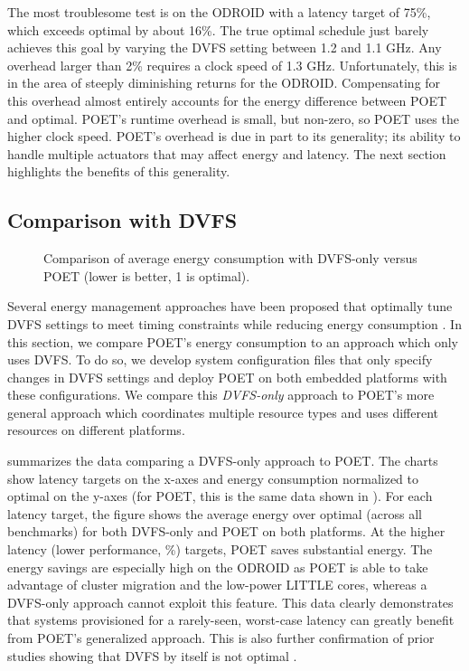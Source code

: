 The most troublesome test is  on the ODROID with a latency target of 75\%, which exceeds optimal by about 16\%.
The true optimal schedule just barely achieves this goal by varying the DVFS setting between 1.2 and 1.1 GHz.
Any overhead larger than 2\% requires a clock speed of 1.3 GHz.
Unfortunately, this is in the area of steeply diminishing returns for the ODROID.
Compensating for this overhead almost entirely accounts for the energy difference between POET and optimal.
POET's runtime overhead is small, but non-zero, so POET uses the higher clock speed.
POET's overhead is due in part to its generality; \ie its ability to handle multiple actuators that may affect energy and latency.
The next section highlights the benefits of this generality.


\subsection{Comparison with DVFS}

\begin{figure}[t]
  \centering
  
  \caption{Comparison of average energy consumption with DVFS-only versus POET (lower is better, 1 is optimal).}
  \label{fig:poet-embedded-dvfs-compare}
\end{figure}

Several energy management approaches have been proposed that optimally tune DVFS settings to meet timing constraints while reducing energy consumption \cite{Albers}.
In this section, we compare POET's energy consumption to an approach which only uses DVFS.
To do so, we develop system configuration files that only specify changes in DVFS settings and deploy POET on both embedded platforms with these configurations.
We compare this \emph{DVFS-only} approach to POET's more general approach which coordinates multiple resource types and uses different resources on different platforms.

 summarizes the data comparing a DVFS-only approach to POET.
The charts show latency targets on the x-axes and energy consumption normalized to optimal on the y-axes (for POET, this is the same data shown in ).
For each latency target, the figure shows the average energy over optimal (across all benchmarks) for both DVFS-only and POET on both platforms.
At the higher latency (lower performance, \%) targets, POET saves substantial energy.
The energy savings are especially high on the ODROID as POET is able to take advantage of cluster migration and the low-power LITTLE cores, whereas a DVFS-only approach cannot exploit this feature.
This data clearly demonstrates that systems provisioned for a rarely-seen, worst-case latency can greatly benefit from POET's generalized approach.
This is also further confirmation of prior studies showing that DVFS by itself is not optimal \cite{Hoffmann2012,MeisnerISCA2011}.



